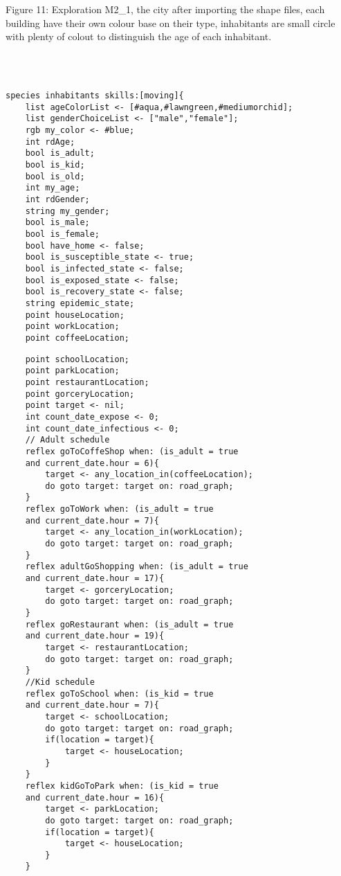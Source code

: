 \documentclass{article}
\begin{document}
\\
\begin{pic11}
\\
\caption{Figure 11: Exploration M2\_1, the city after importing the shape files, each building have their own colour base on their type, inhabitants are small circle with plenty of colout to distinguish the age of each inhabitant.} 
\end{pic11}
\\\\
\begin{tcolorbox}
\begin{lstlisting}
species inhabitants skills:[moving]{
    list ageColorList <- [#aqua,#lawngreen,#mediumorchid];
    list genderChoiceList <- ["male","female"];
	rgb my_color <- #blue;
	int rdAge;
	bool is_adult;
	bool is_kid;
	bool is_old;
	int my_age;
	int rdGender;
	string my_gender;
	bool is_male;
	bool is_female;
	bool have_home <- false;
	bool is_susceptible_state <- true;
	bool is_infected_state <- false;
	bool is_exposed_state <- false;
	bool is_recovery_state <- false;
	string epidemic_state;
	point houseLocation;
	point workLocation;
	point coffeeLocation;
\end{lstlisting}
\end{tcolorbox}
\begin{tcolorbox}
\begin{lstlisting}
	point schoolLocation;
	point parkLocation;
	point restaurantLocation;
	point gorceryLocation;
	point target <- nil;
	int count_date_expose <- 0;
	int count_date_infectious <- 0;
	// Adult schedule
	reflex goToCoffeShop when: (is_adult = true 
	and current_date.hour = 6){
		target <- any_location_in(coffeeLocation);
		do goto target: target on: road_graph;
	}
	reflex goToWork when: (is_adult = true 
	and current_date.hour = 7){
		target <- any_location_in(workLocation);
		do goto target: target on: road_graph;
	}
	reflex adultGoShopping when: (is_adult = true 
	and current_date.hour = 17){
		target <- gorceryLocation;
		do goto target: target on: road_graph;
	}
	reflex goRestaurant when: (is_adult = true 
	and current_date.hour = 19){
		target <- restaurantLocation;
		do goto target: target on: road_graph;
	}
	//Kid schedule
	reflex goToSchool when: (is_kid = true 
	and current_date.hour = 7){
		target <- schoolLocation;
		do goto target: target on: road_graph;
		if(location = target){
			target <- houseLocation;
		}
	}
	reflex kidGoToPark when: (is_kid = true 
	and current_date.hour = 16){
		target <- parkLocation;
		do goto target: target on: road_graph;
		if(location = target){
			target <- houseLocation;
		}
	}
\end{lstlisting}
\end{tcolorbox}
\end{document}
